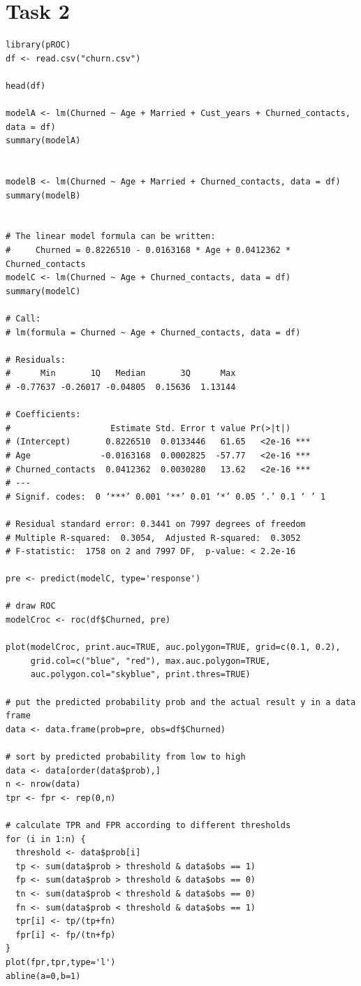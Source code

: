 \documentclass{article}
\begin{document}
\section{Task 2}
\begin{lstlisting}
library(pROC)
df <- read.csv("churn.csv")

head(df)

modelA <- lm(Churned ~ Age + Married + Cust_years + Churned_contacts, data = df)
summary(modelA)


modelB <- lm(Churned ~ Age + Married + Churned_contacts, data = df)
summary(modelB)


# The linear model formula can be written:
#     Churned = 0.8226510 - 0.0163168 * Age + 0.0412362 * Churned_contacts
modelC <- lm(Churned ~ Age + Churned_contacts, data = df)
summary(modelC)

# Call:
# lm(formula = Churned ~ Age + Churned_contacts, data = df)

# Residuals:
#      Min       1Q   Median       3Q      Max 
# -0.77637 -0.26017 -0.04805  0.15636  1.13144 

# Coefficients:
#                    Estimate Std. Error t value Pr(>|t|)    
# (Intercept)       0.8226510  0.0133446   61.65   <2e-16 ***
# Age              -0.0163168  0.0002825  -57.77   <2e-16 ***
# Churned_contacts  0.0412362  0.0030280   13.62   <2e-16 ***
# ---
# Signif. codes:  0 ‘***’ 0.001 ‘**’ 0.01 ‘*’ 0.05 ‘.’ 0.1 ‘ ’ 1

# Residual standard error: 0.3441 on 7997 degrees of freedom
# Multiple R-squared:  0.3054,	Adjusted R-squared:  0.3052 
# F-statistic:  1758 on 2 and 7997 DF,  p-value: < 2.2e-16

pre <- predict(modelC, type='response')

# draw ROC
modelCroc <- roc(df$Churned, pre)

plot(modelCroc, print.auc=TRUE, auc.polygon=TRUE, grid=c(0.1, 0.2),
     grid.col=c("blue", "red"), max.auc.polygon=TRUE,
     auc.polygon.col="skyblue", print.thres=TRUE)

# put the predicted probability prob and the actual result y in a data frame
data <- data.frame(prob=pre, obs=df$Churned)

# sort by predicted probability from low to high
data <- data[order(data$prob),]
n <- nrow(data)
tpr <- fpr <- rep(0,n)

# calculate TPR and FPR according to different thresholds
for (i in 1:n) {
  threshold <- data$prob[i]
  tp <- sum(data$prob > threshold & data$obs == 1)
  fp <- sum(data$prob > threshold & data$obs == 0)
  tn <- sum(data$prob < threshold & data$obs == 0)
  fn <- sum(data$prob < threshold & data$obs == 1)
  tpr[i] <- tp/(tp+fn) 
  fpr[i] <- fp/(tn+fp)
}
plot(fpr,tpr,type='l')
abline(a=0,b=1)

\end{lstlisting}
\end{document}
